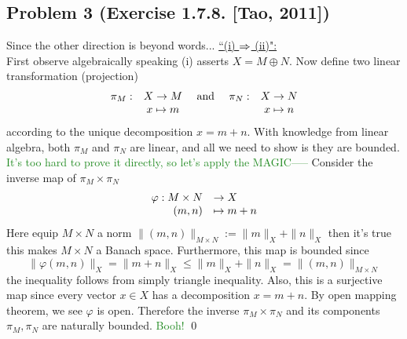 \documentclass[12pt,a4paper]{article}
\newcommand{\fgreen}[1]{\textcolor{ForestGreen}{#1}}
\newcommand{\ra}[1]{\ifnum #1=1\rightarrow\fi\ifnum #1=2\Rightarrow\fi}
\newcommand{\claim}[1]{\underline{``{#1}":}}
\newcommand{\x}{\times}
\begin{document}
\newpage\subsection*{Problem 3 (Exercise 1.7.8. [Tao, 2011])} 
Since the other direction is beyond words... \claim{(i) $\ra2$ (ii)}\\
First observe algebraically speaking (i) asserts $X = M \oplus N$. Now define two linear transformation (projection)
$$\begin{array}{ccccc}
\pi_M: & X \ra1 M & \text{ and }& \pi_N: & X \ra1 N\\
& x\mapsto m &&& x \mapsto n
\end{array}$$
according to the unique decomposition $x = m + n$. With knowledge from linear algebra, both $\pi_M$ and $\pi_N$ are linear, and all we need to show is they are bounded. \fgreen{It's too hard to prove it directly, so let's apply the MAGIC-----} Consider the inverse map of $\pi_M \x \pi_N$
$$\begin{array}{rl}
\varphi: M \x N &\ra1 X\\
		(m, n) &\mapsto m+n
\end{array}$$
Here equip $M\x N$ a norm $\|(m, n)\|_{M\x N} := \|m\|_X + \|n\|_X$ then it's true this makes $M\x N$ a Banach space. Furthermore, this map is bounded since 
$$\|\varphi(m, n)\|_X = \|m+n\|_X \leq \|m\|_X + \|n\|_X = \|(m, n)\|_{M\x N}$$
the inequality follows from simply triangle inequality. Also, this is a surjective map since every vector $x \in X$ has a decomposition $x = m+n$. By open mapping theorem, we see $\varphi$ is open. Therefore the inverse $\pi_M \x \pi_N$ and its components $\pi_M, \pi_N$ are naturally bounded. \fgreen{Booh!} \qed
\end{document}
